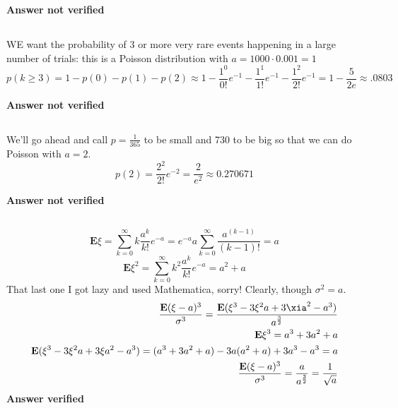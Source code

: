 \textbf{Answer not verified}

\subsection{}

WE want the probability of 3 or more very rare events happening in a large number of trials: this is a Poisson distribution with $a=1000\cdot0.001=1$
\begin{equation}
	p(k \geq 3) = 1 - p(0) - p(1) - p(2) \approx 1 - \frac{1^0}{0!}e^{-1} - \frac{1^1}{1!}e^{-1}- \frac{1^2}{2!}e^{-1} = 1 - \frac{5}{2e} \approx .0803
\end{equation}

\textbf{Answer not verified}

\subsection{}

We'll go ahead and call $p=\frac{1}{365}$ to be small and 730 to be big so that we can do Poisson with $a=2$.
\begin{equation}
	p(2) = \frac{2^2}{2!}e^{-2} = \frac{2}{e^2} \approx 0.270671
\end{equation}

\textbf{Answer not verified}

\subsection{}

\begin{equation}
	\textbf{E}\xi = \sum_{k=0}^{\infty} k \frac{a^k}{k!}e^{-a} = e^{-a}a\sum_{k=0}^{\infty} \frac{a^{(k-1)}}{(k-1)!} = a
\end{equation}
\begin{equation}
	\textbf{E}\xi^2 = \sum_{k=0}^{\infty} k^2 \frac{a^k}{k!}e^{-a} = a^2 + a
\end{equation}
That last one I got lazy and used Mathematica, sorry!  Clearly, though $\sigma^2 = a$.
\begin{eqnarray}
	\frac{\textbf{E}(\xi - a)^3}{\sigma^3} = \frac{\textbf{E}(\xi^3 - 3\xi^2a + 3\xia^2 - a^3)}{a^{\frac{3}{2}}} \\
	 \textbf{E}\xi^3 = a^3+3 a^2+a \\
	 \textbf{E}(\xi^3 - 3\xi^2a + 3\xi a^2 - a^3) = (a^3+3 a^2+a) - 3a(a^2 + a) + 3a^3 - a^3 = a \\
	 \frac{\textbf{E}(\xi - a)^3}{\sigma^3} = \frac{a}{a^{\frac{3}{2}}} = \frac{1}{\sqrt{a}}
\end{eqnarray}
\textbf{Answer verified}

